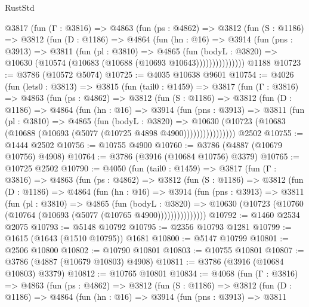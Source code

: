 \begin{lexlean}{RustStd}
\begin{coremodule}
        @3817
          (fun (Γ : @3816) =>
          @4863
            (fun (ps : @4862) =>
            @3812
              (fun (S : @1186) =>
              @3812
                (fun (D : @1186) =>
                @4864
                  (fun (hn : @16) =>
                  @3914
                    (fun (pns : @3913) =>
                    @3811
                      (fun (pl : @3810) =>
                      @4865
                        (fun (bodyL : @3820) =>
                        @10630 (@10574 (@10683 (@10688 (@10693 @10643)))))))))))))))
    @1188
@10723 := @3786 (@10572 @5074)
@10725 := @4035 @10638 @9601
@10754 := @4026
    (fun (lets0 : @3813) =>
    @3815
      (fun (tail0 : @1459) =>
      @3817
        (fun (Γ : @3816) =>
        @4863
          (fun (ps : @4862) =>
          @3812
            (fun (S : @1186) =>
            @3812
              (fun (D : @1186) =>
              @4864
                (fun (hn : @16) =>
                @3914
                  (fun (pns : @3913) =>
                  @3811
                    (fun (pl : @3810) =>
                    @4865
                      (fun (bodyL : @3820) =>
                      @10630
                        (@10723 (@10683 (@10688 (@10693 (@5077 (@10725 @4898 @4900))))))))))))))))
    @2502
@10755 := @1444 @2502
@10756 := @10755 @4900
@10760 := @3786 (@4887 (@10679 @10756) @4908)
@10764 := @3786 (@3916 (@10684 @10756) @3379)
@10765 := @10725 @2502
@10790 := @4050
    (fun (tail0 : @1459) =>
    @3817
      (fun (Γ : @3816) =>
      @4863
        (fun (ps : @4862) =>
        @3812
          (fun (S : @1186) =>
          @3812
            (fun (D : @1186) =>
            @4864
              (fun (hn : @16) =>
              @3914
                (fun (pns : @3913) =>
                @3811
                  (fun (pl : @3810) =>
                  @4865
                    (fun (bodyL : @3820) =>
                    @10630 (@10723 (@10760 (@10764 (@10693 (@5077 (@10765 @4900)))))))))))))))
@10792 := @1460 @2534 @2075
@10793 := @5148 @10792
@10795 := @2356 @10793 @1281
@10799 := @1615 (@1643 (@1510 @10795)) @1681
@10800 := @5147 @10799
@10801 := @2506 @10800
@10802 := @10790 @10801
@10803 := @10755 @10801
@10807 := @3786 (@4887 (@10679 @10803) @4908)
@10811 := @3786 (@3916 (@10684 @10803) @3379)
@10812 := @10765 @10801
@10834 := @4068
    (fun (Γ : @3816) =>
    @4863
      (fun (ps : @4862) =>
      @3812
        (fun (S : @1186) =>
        @3812
          (fun (D : @1186) =>
          @4864
            (fun (hn : @16) =>
            @3914
              (fun (pns : @3913) =>
              @3811

\end{coremodule}
\end{lexlean}
